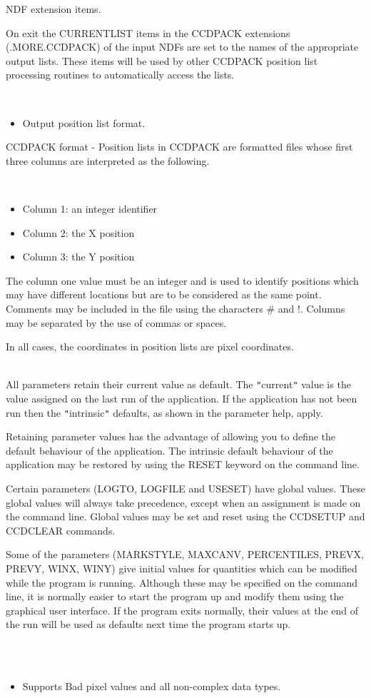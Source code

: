 \documentclass[twoside,11pt]{article}
\newcommand{\htmlref}[2]{#1}
\renewcommand{\_}{\texttt{\symbol{95}}}
\newcommand{\xroutine}[1]{\htmlref{{\sc #1}}{#1}}
\newcommand{\sstdiytopic}[2]{\item[#1:] \mbox{} \\[1.3ex] #2}
\newcommand{\sstimplementationstatus}[1]{
   \item[{Implementation Status:}] \mbox{} \\[1.3ex] #1}
\newcommand{\sstitemlist}[1]{
  \mbox{} \\
  \vspace{-3.5ex}
  \begin{itemize}
     #1
  \end{itemize}
}
\newcommand{\sstitem}{\item}
\newcommand{\sstdiytopic}[2]{\item[{#1}] #2 }
\newcommand{\sstimplementationstatus}[1]{
      \item[Implementation Status:] #1
   }
\newcommand{\sstitemlist}[1]{
      \begin{itemize}
         #1
      \end{itemize}
      \\
   }
\newcommand{\sstitem}{\item}
\begin{document}
{{{         \sstitem
         NDF extension items.

      }
        On exit the CURRENT\_LIST items in the CCDPACK extensions
        (.MORE.CCDPACK) of the input NDFs are set to the names of the
        appropriate output lists. These items will be used by other
        CCDPACK position list processing routines to automatically
        access the lists.

      \sstitemlist{

         \sstitem
         Output position list format.

      }
        CCDPACK format - Position lists in CCDPACK are formatted files
        whose first three columns are interpreted as the following.

      \sstitemlist{

         \sstitem
              Column 1: an integer identifier

         \sstitem
              Column 2: the X position

         \sstitem
              Column 3: the Y position

      }
        The column one value must be an integer and is used to identify
        positions which may have different locations but are to be
        considered as the same point. Comments may be included in the
        file using the characters \# and !. Columns may be separated by
        the use of commas or spaces.

        In all cases, the coordinates in position lists are pixel
        coordinates.
   }
   \sstdiytopic{
      Behaviour of parameters
   }{
      All parameters retain their current value as default. The
      {\tt "}current{\tt "} value is the value assigned on the last run of the
      application. If the application has not been run then the
      {\tt "}intrinsic{\tt "} defaults, as shown in the parameter help, apply.

      Retaining parameter values has the advantage of allowing you to
      define the default behaviour of the application.  The intrinsic
      default behaviour of the application may be restored by using the
      RESET keyword on the command line.

      Certain parameters (LOGTO, LOGFILE and USESET) have global values.
      These global values will always take precedence, except when an
      assignment is made on the command line.  Global values may be set
      and reset using the \xroutine{CCDSETUP} and \xroutine{CCDCLEAR} commands.

      Some of the parameters (MARKSTYLE, MAXCANV, PERCENTILES, PREVX,
      PREVY, WINX, WINY)  give initial values for quantities which can
      be modified while the program is running.  Although these may be
      specified on the command line, it is normally easier to start
      the program up and modify them using the graphical user interface.
      If the program exits normally, their values at the end of the run
      will be used as defaults next time the program starts up.
   }
   \sstimplementationstatus{
      \sstitemlist{

         \sstitem
         Supports Bad pixel values and all non-complex data types.
      }
   }
}
\end{document}
